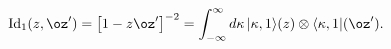 \begin{equation*}
\mathrm{Id}_1(z,\oz')=\bigl[1-z\oz'\bigr]^{-2}=
\int_{-\infty}^{\infty}d\kappa\,|\kappa,1\rangle(z)
\otimes \langle\kappa,1|(\oz').
\end{equation*}

